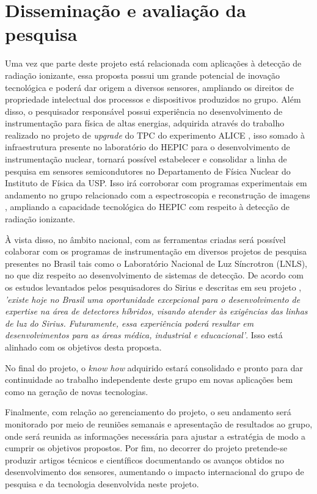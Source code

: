 \chapter{Disseminação e avaliação da pesquisa}

Uma vez que parte deste projeto está relacionada com aplicações à detecção de radiação ionizante, essa proposta possui um grande potencial de inovação tecnológica e poderá dar origem a diversos sensores, ampliando os direitos de propriedade intelectual dos processos e dispositivos produzidos no grupo. Além disso, o pesquisador responsável possui experiência no desenvolvimento de instrumentação para física de altas energias, adquirida através do trabalho realizado no projeto de {\it upgrade} do TPC do experimento ALICE \cite{tpcNIM}, isso somado à infraestrutura presente no laboratório do HEPIC para o desenvolvimento de instrumentação nuclear, tornará possível estabelecer e consolidar a linha de pesquisa em sensores semicondutores no Departamento de Física Nuclear do Instituto de Física da USP. Isso irá corroborar com programas experimentais em andamento no grupo relacionado com a espectroscopia e reconstrução de imagens \cite{THGEM,NIM,xray}, ampliando a capacidade tecnológica do HEPIC com respeito à detecção de radiação ionizante. 

À vista disso, no âmbito nacional, com as ferramentas criadas será possível colaborar com os programas de instrumentação em diversos projetos de pesquisa presentes no Brasil tais como o Laboratório Nacional de Luz Síncrotron (LNLS), no que diz respeito ao desenvolvimento de sistemas de detecção. De acordo com os estudos levantados pelos pesquisadores do Sirius e descritas em seu projeto \cite{sirius}, {\it 'existe hoje no Brasil uma oportunidade excepcional para o desenvolvimento de expertise na área de detectores híbridos, visando atender às exigências das linhas de luz do Sirius. Futuramente, essa experiência poderá resultar em desenvolvimentos para as áreas médica, industrial e educacional'}. Isso está alinhado com os objetivos desta proposta.

No final do projeto, o {\it know how} adquirido estará consolidado e pronto para dar continuidade ao trabalho independente deste grupo em novas aplicações bem como na geração de novas tecnologias.

Finalmente, com relação ao gerenciamento do projeto, o seu andamento será monitorado por meio de reuniões semanais e apresentação de resultados ao grupo, onde será reunida as informações necessária para ajustar a estratégia de modo a cumprir os objetivos propostos. Por fim, no decorrer do projeto pretende-se produzir artigos técnicos e científicos documentando os avanços obtidos no desenvolvimento dos sensores, aumentando o impacto internacional do grupo de pesquisa e da tecnologia desenvolvida neste projeto.


